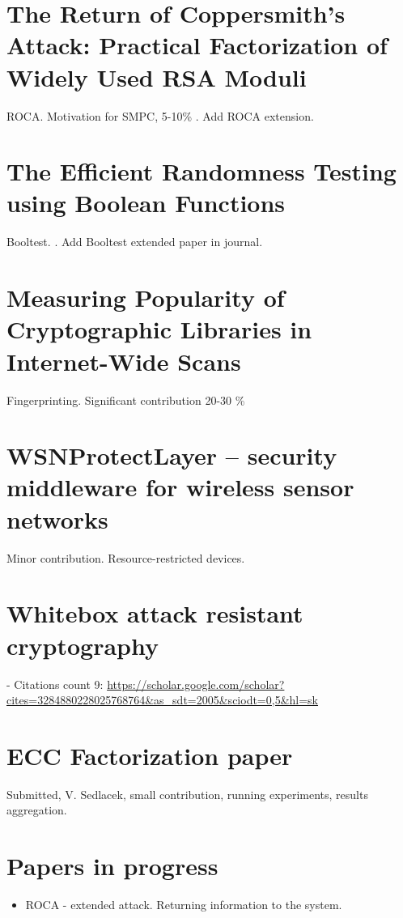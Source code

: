 \documentclass[
  digital, %
  twoside, %
  table,   %
  lof,     %
  lot,     %
]{fithesis3}
\begin{document}
\begin{ecmmnt}
\section{The Return of Coppersmith's Attack: Practical Factorization of Widely Used RSA Moduli}
ROCA. Motivation for SMPC, 5-10\% \cite{2017-ccs-nemec}.
Add ROCA extension.

\section{The Efficient Randomness Testing using Boolean Functions}
Booltest. \cite{booltest_secrypt2017}.
Add Booltest extended paper in journal.

\section{Measuring Popularity of Cryptographic Libraries in Internet-Wide Scans}
Fingerprinting. Significant contribution 20-30 \% \cite{2017-acsac-nemec}

\section{WSNProtectLayer – security middleware for wireless sensor networks}
Minor contribution. Resource-restricted devices. \cite{wsnprotectlayer}

\section{Whitebox attack resistant cryptography}
\cite{whitebox_klinec_santacrypt2013, Klinec2013thesis} 

- Citations count 9: \url{https://scholar.google.com/scholar?cites=3284880228025768764&as_sdt=2005&sciodt=0,5&hl=sk}

\section{ECC Factorization paper}
Submitted, V. Sedlacek, small contribution, running experiments, results aggregation. 

\section{Papers in progress}
\begin{itemize}
	\item ROCA - extended attack. Returning information to the system.
    

\end{itemize}
\end{ecmmnt}
\end{document}
